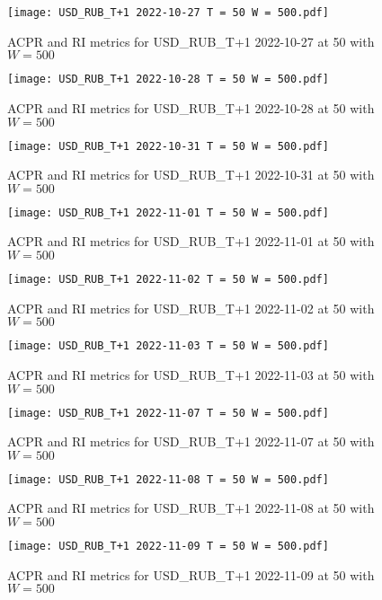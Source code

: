 \begin{figure}[htbp]
	\texttt{[image: USD\_RUB\_T+1 2022-10-27 T = 50 W = 500.pdf]}
	\caption{ACPR and RI metrics for USD\_RUB\_T+1 2022-10-27 at 50 with $W = 500$}
\end{figure}

\begin{figure}[htbp]
	\texttt{[image: USD\_RUB\_T+1 2022-10-28 T = 50 W = 500.pdf]}
	\caption{ACPR and RI metrics for USD\_RUB\_T+1 2022-10-28 at 50 with $W = 500$}
\end{figure}

\begin{figure}[htbp]
	\texttt{[image: USD\_RUB\_T+1 2022-10-31 T = 50 W = 500.pdf]}
	\caption{ACPR and RI metrics for USD\_RUB\_T+1 2022-10-31 at 50 with $W = 500$}
\end{figure}

\begin{figure}[htbp]
	\texttt{[image: USD\_RUB\_T+1 2022-11-01 T = 50 W = 500.pdf]}
	\caption{ACPR and RI metrics for USD\_RUB\_T+1 2022-11-01 at 50 with $W = 500$}
\end{figure}

\begin{figure}[htbp]
	\texttt{[image: USD\_RUB\_T+1 2022-11-02 T = 50 W = 500.pdf]}
	\caption{ACPR and RI metrics for USD\_RUB\_T+1 2022-11-02 at 50 with $W = 500$}
\end{figure}

\begin{figure}[htbp]
	\texttt{[image: USD\_RUB\_T+1 2022-11-03 T = 50 W = 500.pdf]}
	\caption{ACPR and RI metrics for USD\_RUB\_T+1 2022-11-03 at 50 with $W = 500$}
\end{figure}

\begin{figure}[htbp]
	\texttt{[image: USD\_RUB\_T+1 2022-11-07 T = 50 W = 500.pdf]}
	\caption{ACPR and RI metrics for USD\_RUB\_T+1 2022-11-07 at 50 with $W = 500$}
\end{figure}

\begin{figure}[htbp]
	\texttt{[image: USD\_RUB\_T+1 2022-11-08 T = 50 W = 500.pdf]}
	\caption{ACPR and RI metrics for USD\_RUB\_T+1 2022-11-08 at 50 with $W = 500$}
\end{figure}

\begin{figure}[htbp]
	\texttt{[image: USD\_RUB\_T+1 2022-11-09 T = 50 W = 500.pdf]}
	\caption{ACPR and RI metrics for USD\_RUB\_T+1 2022-11-09 at 50 with $W = 500$}
\end{figure}


